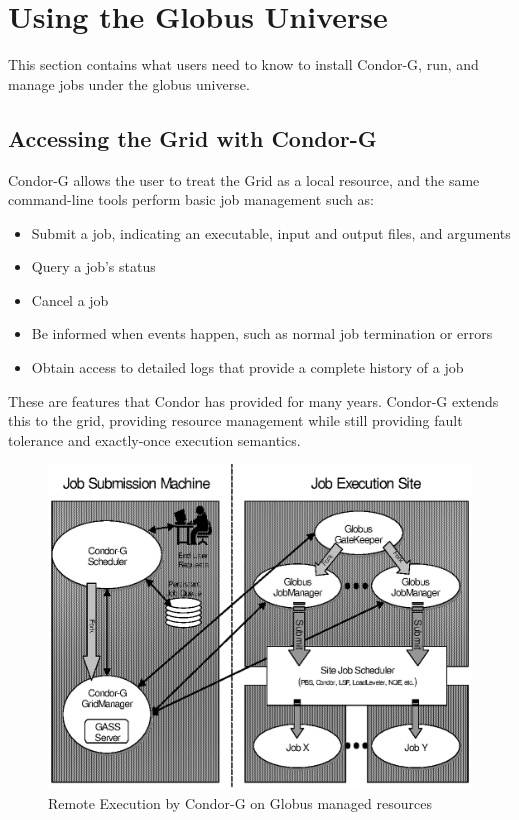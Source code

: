 \section{\label{sec:Using-Condor-G}Using the Globus Universe}

This section contains what users need to know to install Condor-G,
run, and manage jobs under
the globus universe.

\subsection{\label{sec:Grid-Access}Accessing the Grid with Condor-G}

Condor-G allows the user to treat the Grid as a local resource,
and the same command-line tools perform basic job management such as:
\begin{itemize}
\item Submit a job, indicating an executable, input and output files,
and arguments
\item Query a job's status
\item Cancel a job
\item Be informed when events happen,
such as normal job termination or errors
\item Obtain access to detailed logs that provide a complete history of a job
\end{itemize}

These are features that Condor has provided for many years.
Condor-G extends this to the grid,
providing resource management 
while still providing fault tolerance and exactly-once execution 
semantics. 

\begin{figure}[hbt]
\centering
\includegraphics{condor-g/gfig1.eps}
\caption{\label{fig:condorg}Remote Execution by Condor-G on Globus managed resources}
\end{figure}

